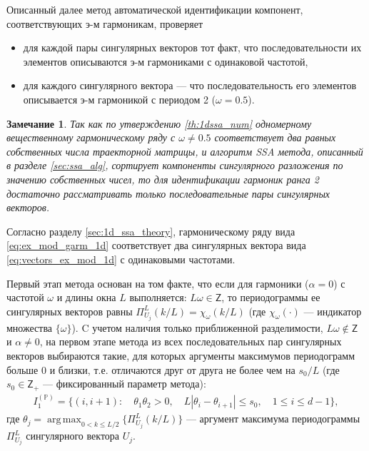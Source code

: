 \documentclass[specialist,
               substylefile = spbu.rtx,
               subf,href,colorlinks=true, 12pt]{disser}
\def\argmax{\mathop{\mathrm{argmax}}}
\def\argmax{\mathop{\mathrm{arg\,max}}}
\newtheorem{remark}{Замечание}
\begin{document}
Описанный далее метод автоматической идентификации компонент, соответствующих э-м гармоникам, проверяет
\begin{itemize}
\item для каждой пары сингулярных векторов тот факт, что последовательности их элементов описываются э-м гармониками с одинаковой частотой,
\item для каждого сингулярного вектора --- что последовательность его элементов описывается э-м гармоникой с периодом 2 ($\omega=0.5$).
\end{itemize}

\begin{remark}
Так как по утверждению \ref{th:1dssa_num} одномерному вещественному гармоническому ряду с $\omega \not = 0.5$ соответствует два равных собственных числа траекторной матрицы, и алгоритм SSA метода, описанный в разделе \ref{sec:ssa_alg}, сортирует компоненты сингулярного разложения по значению собственных чисел, то
для идентификации гармоник ранга 2 достаточно рассматривать только последовательные пары сингулярных векторов.
\end{remark}

Согласно разделу \ref{sec:1d_ssa_theory}, гармоническому ряду вида \eqref{eq:ex_mod_garm_1d} соответствует два сингулярных вектора вида \eqref{eq:vectors_ex_mod_1d} с одинаковыми частотами.

Первый этап метода основан на том факте, что если для гармоники ($\alpha = 0$) с частотой $\omega$ и длины окна $L$ выполняется: $L \omega \in \mathsf{Z}$, то периодограммы ее сингулярных векторов равны $\Pi_{U_j}^L(k/L)=\chi_{\omega}(k/L)$ (где $\chi_{\omega}(\cdot)$ --- индикатор множества $\{\omega\}$).
C учетом наличия только приближенной разделимости, $L\omega \not \in \mathsf{Z}$ и $\alpha \not = 0$,
на первом этапе метода из всех последовательных пар сингулярных векторов выбираются такие, для которых аргументы максимумов периодограмм больше 0 и близки, т.е. отличаются друг от друга не более чем на $s_0/L$ (где $s_0 \in \mathsf{Z}_+$ --- фиксированный параметр метода):
\begin{gather} \label{eq:I_1_P}
I_1^{(\mathbb{P})} = \{ (i, i+1): \quad \theta_1 \theta_2 >0, \quad L |\theta_i - \theta_{i+1}| \leqslant s_0, \quad 1 \leqslant i \leqslant d -1  \},
\end{gather}
где $\theta_j = \argmax_{0 < k \leqslant L/2} \{\Pi_{U_j}^L(k/L)\}$ --- аргумент максимума периодограммы $\Pi_{U_j}^{L}$ сингулярного вектора $U_j$.
\end{document}

